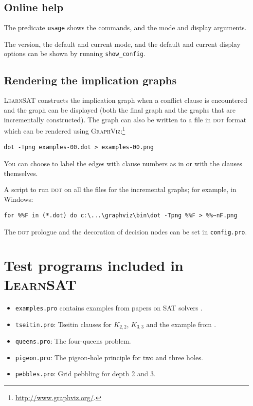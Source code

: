 \documentclass[11pt]{report}
\newcommand*{\p}[1]{\textup{\texttt{#1}}}
\newcommand*{\ls}{\textsc{LearnSAT}}
\newcommand*{\dt}{\textsc{dot}}
\begin{document}
\subsection{Online help}

The predicate \p{usage} shows the commands, and the mode and display
arguments.

The version, the default and current mode, and the default and current
display options can be shown by running \p{show\_config}.

\subsection{Rendering the implication graphs}\label{s.impl}

\ls{} constructs the implication graph when a conflict clause is
encountered and the graph can be displayed (both the final graph and the
graphs that are incrementally constructed). 
The graph can
also be written to a file in \dt{} format which can be rendered using
\textsc{GraphViz}:\footnote{\url{http://www.graphviz.org/}.}

\begin{verbatim}
dot -Tpng examples-00.dot > examples-00.png
\end{verbatim}
You can choose to label the edges with clause numbers as in \cite{mlm}
or with the clauses themselves.

A script to run \dt{} on all the files for the incremental graphs; for
example, in Windows:
\begin{verbatim}
for %%F in (*.dot) do c:\...\graphviz\bin\dot -Tpng %%F > %%~nF.png
\end{verbatim}

The \dt{} prologue and the decoration of decision nodes can be set in
\p{config.pro}.


\section{Test programs included in \ls{}}

\begin{itemize}
\item \p{examples.pro} contains examples from papers on SAT
solvers \cite{mz,mlm,ms}.

\item \p{tseitin.pro}: Tseitin clauses for $K_{2,2}$,
$K_{3,3}$ and the example from \cite[Section 4.5]{mlcs}.

\item \p{queens.pro}: The four-queens problem.

\item \p{pigeon.pro}: The pigeon-hole principle for two and three holes.

\item \p{pebbles.pro}: Grid pebbling for depth 2 and 3.
\end{itemize}
\end{document}
